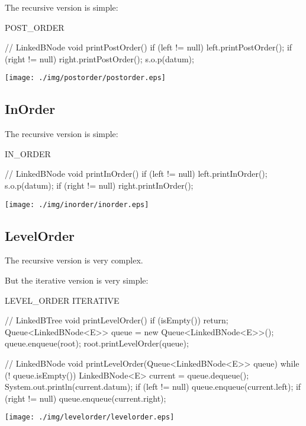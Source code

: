 \documentclass[a4paper, 9pt]{extarticle}
\begin{document}
The recursive version is simple:

\begin{multicols}{2}
\begin{blackboard}
      POST_ORDER

// LinkedBNode
void printPostOrder() {
  if (left != null) {
    left.printPostOrder();
  }
  if (right != null) {
    right.printPostOrder();
  }
  s.o.p(datum);
}
\end{blackboard}
\columnbreak
\texttt{[image: ./img/postorder/postorder.eps]}
\end{multicols}

\subsection{InOrder}

The recursive version is simple:

\begin{multicols}{2}
\begin{blackboard}
      IN_ORDER

// LinkedBNode
void printInOrder() {
  if (left != null) {
    left.printInOrder();
  }
  s.o.p(datum);
  if (right != null) {
    right.printInOrder();
  }
}
\end{blackboard}
\columnbreak
\texttt{[image: ./img/inorder/inorder.eps]}
\end{multicols}

\newpage
\subsection{LevelOrder}

The recursive version is very complex.

But the iterative version is very simple:

\begin{multicols}{2}
\begin{blackboard}
      LEVEL_ORDER ITERATIVE

// LinkedBTree
void printLevelOrder() {
  if (isEmpty()) {
    return;
  }
  Queue<LinkedBNode<E>> queue =
                   new Queue<LinkedBNode<E>>();
  queue.enqueue(root);
  root.printLevelOrder(queue);
}

// LinkedBNode
void printLevelOrder(Queue<LinkedBNode<E>> queue) {
  while (! queue.isEmpty()) {
    LinkedBNode<E> current = queue.dequeue();
    System.out.println(current.datum);
    if (left != null) {
      queue.enqueue(current.left);
    }
    if (right != null) {
      queue.enqueue(current.right);
    }
  }
}
\end{blackboard}
\columnbreak
\texttt{[image: ./img/levelorder/levelorder.eps]}
\end{multicols}
\end{document}
